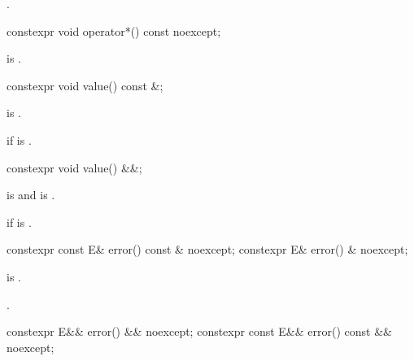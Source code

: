\begin{itemdescr}
\pnum
\returns
{}.
\end{itemdescr}

%
\begin{itemdecl}
constexpr void operator*() const noexcept;
\end{itemdecl}

\begin{itemdescr}
\pnum
\expects
{} is .
\end{itemdescr}

%
\begin{itemdecl}
constexpr void value() const &;
\end{itemdecl}

\begin{itemdescr}
\pnum
\mandates
{} is .

\pnum
\throws
{} if  is .
\end{itemdescr}

%
\begin{itemdecl}
constexpr void value() &&;
\end{itemdecl}

\begin{itemdescr}
\pnum
\mandates
{} is  and
 is .

\pnum
\throws
{}
if  is .
\end{itemdescr}

%
\begin{itemdecl}
constexpr const E& error() const & noexcept;
constexpr E& error() & noexcept;
\end{itemdecl}

\begin{itemdescr}
\pnum
\expects
{} is .

\pnum
\returns
{}.
\end{itemdescr}

%
\begin{itemdecl}
constexpr E&& error() && noexcept;
constexpr const E&& error() const && noexcept;
\end{itemdecl}

